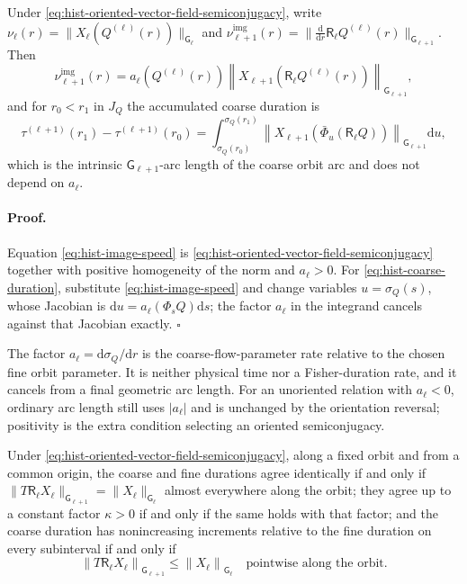 Under \eqref{eq:hist-oriented-vector-field-semiconjugacy}, write
$\nu_\ell(r)=\lVert X_\ell(Q^{(\ell)}(r))\rVert_{\mathsf G_\ell}$ and
$\nu^{\mathrm{img}}_{\ell+1}(r)
=\lVert\tfrac{\mathrm d}{\mathrm dr}\mathsf R_\ell Q^{(\ell)}(r)
\rVert_{\mathsf G_{\ell+1}}$.  Then
\begin{equation}
\nu^{\mathrm{img}}_{\ell+1}(r)
=a_\ell\left(Q^{(\ell)}(r)\right)
\left\lVert X_{\ell+1}\left(\mathsf R_\ell Q^{(\ell)}(r)\right)
\right\rVert_{\mathsf G_{\ell+1}},
\label{eq:hist-image-speed}
\end{equation}
and for $r_0<r_1$ in $J_Q$ the accumulated coarse duration is
\begin{equation}
\tau^{(\ell+1)}(r_1)-\tau^{(\ell+1)}(r_0)
=\int_{\sigma_Q(r_0)}^{\sigma_Q(r_1)}
\left\lVert X_{\ell+1}\left(\bar\Phi_u(\mathsf R_\ell Q)\right)
\right\rVert_{\mathsf G_{\ell+1}}\mathrm du,
\label{eq:hist-coarse-duration}
\end{equation}
which is the intrinsic $\mathsf G_{\ell+1}$-arc length of the coarse orbit arc
and does not depend on $a_\ell$.  

\paragraph{Proof.}
Equation \eqref{eq:hist-image-speed} is
\eqref{eq:hist-oriented-vector-field-semiconjugacy} together with positive
homogeneity of the norm and $a_\ell>0$.  For
\eqref{eq:hist-coarse-duration}, substitute
\eqref{eq:hist-image-speed} and change variables $u=\sigma_Q(s)$, whose
Jacobian is $\mathrm du=a_\ell(\Phi_sQ)\mathrm ds$; the factor $a_\ell$ in the
integrand cancels against that Jacobian exactly.  $\square$

The factor $a_\ell=\mathrm d\sigma_Q/\mathrm dr$ is the coarse-flow-parameter
rate relative to the chosen fine orbit parameter.  It is neither physical time
nor a Fisher-duration rate, and it cancels from a final geometric arc length.
For an unoriented relation with $a_\ell<0$, ordinary arc length still uses
$|a_\ell|$ and is unchanged by the orientation reversal; positivity is the
extra condition selecting an oriented semiconjugacy.

Under \eqref{eq:hist-oriented-vector-field-semiconjugacy}, along a fixed orbit
and from a common origin, the coarse and fine durations agree identically if
and only if
$\lVert T\mathsf R_\ell X_\ell\rVert_{\mathsf G_{\ell+1}}
=\lVert X_\ell\rVert_{\mathsf G_\ell}$ almost everywhere along the orbit; they
agree up to a constant factor $\kappa>0$ if and only if the same holds with
that factor; and the coarse duration has nonincreasing increments relative to
the fine duration on every subinterval if and only if
\begin{equation}
\left\lVert T\mathsf R_\ell X_\ell\right\rVert_{\mathsf G_{\ell+1}}
\leq\left\lVert X_\ell\right\rVert_{\mathsf G_\ell}
\quad\text{pointwise along the orbit.}
\label{eq:hist-duration-criterion}
\end{equation}

